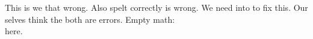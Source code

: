 \documentclass{article}
\begin{document}
This is we that wrong.
Also spelt correctly is wrong.
We need into to fix this.
Our selves think the both are errors.
Empty math: $$ $$ here.
\end{document}
